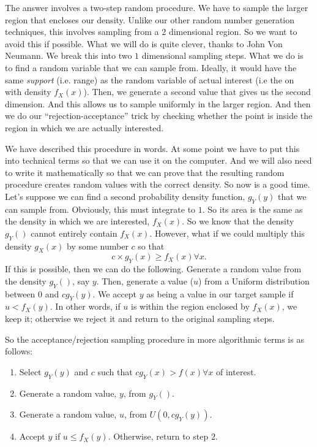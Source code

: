 \documentclass{article}
\begin{document}
The answer involves a two-step random procedure.  We have to sample
the larger region that encloses our density.  Unlike our other random
number generation techniques, this involves sampling from a $2$
dimensional region.  So we want to avoid this if possible.  What we
will do is quite clever, thanks to John Von Neumann.  We break this
into two $1$ dimensional sampling steps.  What we do is to find a
random variable that we can sample from.  Ideally, it would have the
same \textit{support} (i.e. range) as the random variable of actual
interest (i.e the on with density $f_X(x)$).  Then, we generate a
second value that gives us the second dimension.  And this allows us
to sample uniformly in the larger region. And then we do our
``rejection-acceptance'' trick by checking whether the point is inside
the region in which we are actually interested. 

We have described this procedure in words. At some point we have to
put this into technical terms so that we can use it on the computer.
And we will also need to write it mathematically so that we can prove
that the resulting random procedure creates random values with the
correct density.  So now is a good time.  Let's suppose we can find a
second probability density function, $g_Y(y)$ that we can sample from.
Obviously, this must integrate to $1$. So its area is the same as the
density in which we are interested, $f_X(x)$.  So we know that the
density $g_Y()$ cannot entirely contain $f_X(x)$.  However, what if we
could multiply this density $g_X(x)$ by some number $c$
so that 
$$ c \times g_Y(x) \ge f_X(x) \forall x.$$ If this is possible, then
we can do the following.  Generate a random value from the density
$g_Y()$, say $y$.  Then, generate a value ($u$) from a Uniform
distribution between $0$ and $c g_Y(y)$.  We accept $y$ as being a
value in our target sample if $u < f_X(y)$.
In other words, if $u$ is within the region enclosed by $f_X(x)$,
we keep it; otherwise we reject it and return to the original
sampling steps.

So the acceptance/rejection sampling procedure in more algorithmic
terms is as follows:
\begin{enumerate}
\item Select $g_Y(y)$ and $c$ such that  
    $c g_Y(x) > f(x) \forall x$ of interest.
\item Generate a random value, $y$,  from $g_Y()$.
\item Generate a random value, $u$, from $U(0, c g_Y(y))$.
\item Accept $y$ if $u \le f_X(y)$.
  Otherwise, return to step $2$.
\end{enumerate}
\end{document}

